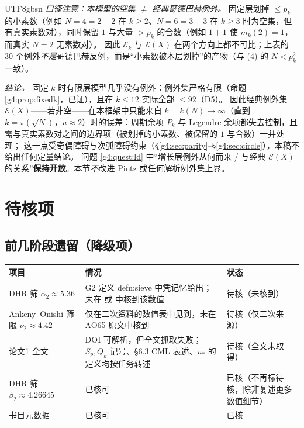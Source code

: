 \documentclass[11pt,a4paper]{article}
\newcommand{\ust}{u_{*}}               %
\newcommand{\Exc}{\mathcal E}          %
\theoremstyle{plain}
\theoremstyle{definition}
\begin{document}
\begin{CJK}{UTF8}{gbsn}
\emph{口径注意：本模型的空集 $\ne$ 经典哥德巴赫例外。} 固定层划掉 $\le p_k$ 的小素数（例如 $N=4=2+2$ 在 $k\ge2$、$N=6=3+3$ 在 $k\ge3$ 时为空集，但有真实素数对），同时保留 $1$ 与大量 $>p_k$ 的合数（例如 $1+1$ 使 $m_k(2)=1$，而真实 $N=2$ 无素数对）。
因此 $\Exc_k$ 与 $\Exc(X)$ 在两个方向上都不可比；上表的 $30$ 个例外\emph{不是}哥德巴赫反例，而是“小素数被本层划掉”的产物（与 (4) 的 $N<p_k^2$ 一致）。

\emph{结论。} 固定 $k$ 时有限层模型几乎没有例外：例外集严格有限（命题 \ref{g4:prop:fixedk}，已证），且在 $k\le12$ 实际全部 $\le92$（D5）。
因此经典例外集 $\Exc(X)$——若非空——在本框架中只能来自 $k=k(N)\to\infty$（直到 $k=\pi(\sqrt N)$，$u\approx2$）时的误差：周期余项 $P_k$ 与 Legendre 余项都失去控制，且需与真实素数对之间的边界项（被划掉的小素数、被保留的 $1$ 与合数）一并处理；
这一点受奇偶障碍与次弧障碍约束（\S\ref{g4:sec:parity}--\S\ref{g4:sec:circle}），本稿不给出任何定量结论。
问题 \ref{g4:quest:ld} 中“增长层例外从何而来 / 与经典 $\Exc(X)$ 的关系”\textbf{保持开放}。本节\emph{不}改进 Pintz \cite{Pin18} 或任何解析例外集上界。

\appendix
\section{待核项}\label{g4:sec:pending}

\subsection*{前几阶段遗留（降级项）}
\begin{center}
\begin{tabular}{p{3.6cm}p{6.6cm}p{4.2cm}}
\hline
项目 & 情况 & 状态\\
\hline
DHR 筛 $\alpha_2\approx5.36$ & G2 定义 defn:sieve 中凭记忆给出；未在 \cite{DHR88} 或 \cite{DH08} 中核到该数值 & 待核（未核到）\\
Ankeny--Onishi 筛限 $\nu_2\approx4.42$ & 仅在二次资料的数值表中见到，未在 AO65 \cite{AO65} 原文中核到 & 待核（仅二次来源）\\
论文1 \cite{Wang26} 全文 & DOI 可解析，但全文抓取失败；$S_p,Q_k$ 记号、\S6.3 CML 表述、$\ust$ 的定义均按任务转述 & 待核（全文未取得）\\
DHR 筛 $\beta_2\approx4.26645$ & 已核可 & 已核（不再标待核，除非复述更多数值细节）\\
\cite{DHR88,Iwa80,AO65} 书目元数据 & 已核可 & 已核\\
\hline
\end{tabular}
\end{center}


\end{CJK}
\end{document}
